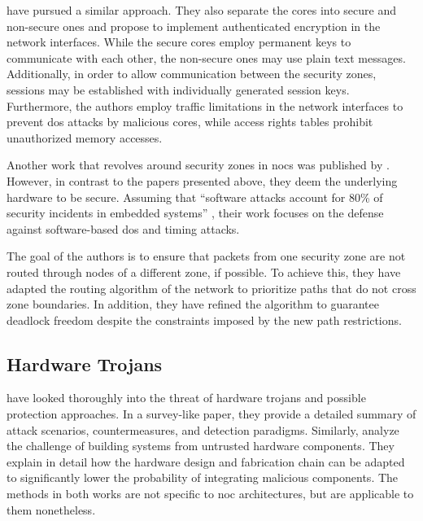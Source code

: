 \citeauthor{kapoor13nocauthenc} \cite{kapoor13nocauthenc} have pursued a similar approach. They also separate the cores into secure and non-secure
ones and propose to implement authenticated encryption in the network interfaces. While the secure
cores employ permanent keys to communicate with each other, the non-secure ones may use plain text messages. Additionally, in order to allow
communication between the security zones, sessions may be established with individually generated session keys. Furthermore, the authors employ
traffic limitations in the network interfaces to prevent \gls{dos} attacks by malicious cores, while access rights tables prohibit unauthorized
memory accesses.

Another work that revolves around security zones in \glspl{noc} was published by \citeauthor{fernandes16nocrouting} \cite{fernandes16nocrouting}.
However, in contrast to the papers presented above, they deem the underlying hardware to be secure. Assuming that \enquote{software attacks account
for 80\% of security incidents in embedded systems} \cite[1]{fernandes16nocrouting}, their work focuses on the defense against software-based
\gls{dos} and timing attacks.

The goal of the authors is to ensure that packets from one security zone are not routed through nodes of a different zone, if possible. To achieve
this, they have adapted the routing algorithm of the network to prioritize paths that do not cross zone boundaries. In addition, they have
refined the algorithm to guarantee deadlock freedom despite the constraints imposed by the new path restrictions.

\subsection{Hardware Trojans}
\citeauthor{bhunia14hardwaretrojans} \cite{bhunia14hardwaretrojans} have looked thoroughly into the threat of hardware trojans and possible protection
approaches. In a survey-like paper, they provide a detailed summary of attack scenarios, countermeasures, and detection paradigms. Similarly,
\citeauthor{sethumadhavan15trustworthyhardware} \cite{sethumadhavan15trustworthyhardware} analyze the challenge of building systems from untrusted
hardware components. They explain in detail how the hardware design and fabrication chain can be adapted to significantly lower the probability of
integrating malicious components. The methods in both works are not specific to \gls{noc} architectures, but are applicable to them nonetheless.


